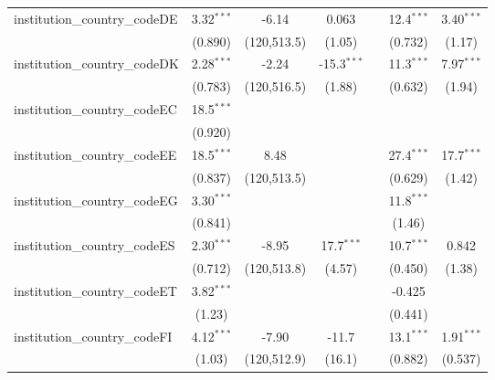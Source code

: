 \begin{tabular}{lcccccc}
   institution\_country\_codeDE          & 3.32$^{***}$   & -6.14         & 0.063         &            & 12.4$^{***}$  & 3.40$^{***}$\\   
                                         & (0.890)        & (120,513.5)   & (1.05)        &            & (0.732)       & (1.17)\\   
   institution\_country\_codeDK          & 2.28$^{***}$   & -2.24         & -15.3$^{***}$ &            & 11.3$^{***}$  & 7.97$^{***}$\\   
                                         & (0.783)        & (120,516.5)   & (1.88)        &            & (0.632)       & (1.94)\\   
   institution\_country\_codeEC          & 18.5$^{***}$   &               &               &            &               &   \\   
                                         & (0.920)        &               &               &            &               &   \\   
   institution\_country\_codeEE          & 18.5$^{***}$   & 8.48          &               &            & 27.4$^{***}$  & 17.7$^{***}$\\   
                                         & (0.837)        & (120,513.5)   &               &            & (0.629)       & (1.42)\\   
   institution\_country\_codeEG          & 3.30$^{***}$   &               &               &            & 11.8$^{***}$  &   \\   
                                         & (0.841)        &               &               &            & (1.46)        &   \\   
   institution\_country\_codeES          & 2.30$^{***}$   & -8.95         & 17.7$^{***}$  &            & 10.7$^{***}$  & 0.842\\   
                                         & (0.712)        & (120,513.8)   & (4.57)        &            & (0.450)       & (1.38)\\   
   institution\_country\_codeET          & 3.82$^{***}$   &               &               &            & -0.425        &   \\   
                                         & (1.23)         &               &               &            & (0.441)       &   \\   
   institution\_country\_codeFI          & 4.12$^{***}$   & -7.90         & -11.7         &            & 13.1$^{***}$  & 1.91$^{***}$\\   
                                         & (1.03)         & (120,512.9)   & (16.1)        &            & (0.882)       & (0.537)\\   

\end{tabular}

